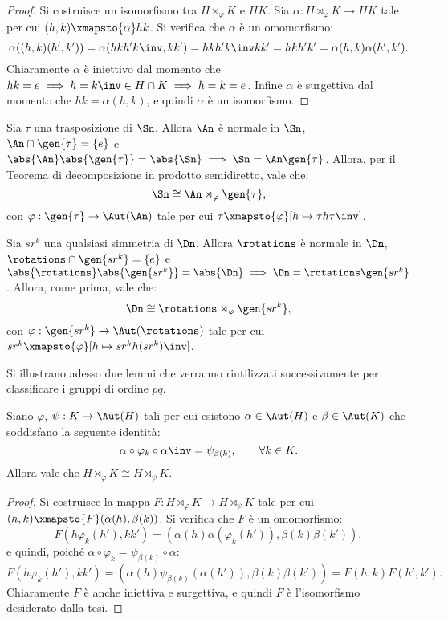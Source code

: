 \documentclass[12pt]{scrartcl}
\begin{document}
	\begin{proof}
		Si costruisce un isomorfismo tra $H \rtimes_\varphi K$ e $HK$. Sia
		$\alpha : H \rtimes_\varphi K \to HK$ tale per cui
		$(h, k) \xmapsto{\alpha} hk$. Si verifica che $\alpha$ è un
		omomorfismo:
		\[ \alpha((h,k)(h',k')) = \alpha(h k h' k\inv, k k') =
			h k h' k\inv k k' = hkh'k' = \alpha(h,k)\alpha(h',k'). \]
		Chiaramente $\alpha$ è iniettivo dal momento che $hk=e \implies h = k\inv \in H \cap K \implies h = k = e$. Infine $\alpha$ è surgettiva dal momento che $hk = \alpha(h, k)$,
		e quindi $\alpha$ è un isomorfismo.
	\end{proof}
	
	\begin{example}[$\Sn \cong \An \rtimes_\varphi \gen{\tau}$]
		Sia $\tau$ una trasposizione di $\Sn$. Allora $\An$ è normale in $\Sn$,
		$\An \cap \gen{\tau} = \{e\}$ e $\abs{\An} \abs{\gen{\tau}} = \abs{\Sn} \implies
		\Sn = \An \gen{\tau}$. Allora, per il Teorema di decomposizione in prodotto
		semidiretto, vale che:
		\[ \Sn \cong \An \rtimes_\varphi \gen{\tau}, \]
		con $\varphi : \gen{\tau} \to \Aut(\An)$ tale per cui
		$\tau \xmapsto{\varphi} [h \mapsto \tau h \tau\inv]$.
	\end{example}
	
	\begin{example}
		Sia $sr^k$ una qualsiasi simmetria di $\Dn$. Allora $\rotations$ è normale in $\Dn$,
		$\rotations \cap \gen{sr^k} = \{e\}$ e $\abs{\rotations} \abs{\gen{s r^k}} = \abs{\Dn} \implies
		\Dn = \rotations \gen{s r^k}$. Allora, come prima, vale che:
		\[ \Dn \cong \rotations \rtimes_\varphi \gen{sr^k}, \]
		con $\varphi : \gen{s r^k} \to \Aut(\rotations)$ tale per cui
		$s r^k \xmapsto{\varphi} [h \mapsto sr^k h (sr^k)\inv]$.
	\end{example}
	
	Si illustrano adesso due lemmi che verranno riutilizzati successivamente per classificare
	i gruppi di ordine $pq$.
	
	\begin{lemma}
		Siano $\varphi$, $\psi : K \to \Aut(H)$ tali per cui esistono
		$\alpha \in \Aut(H)$ e $\beta \in \Aut(K)$ che soddisfano la seguente
		identità:
		\[ \alpha \circ \varphi_k \circ \alpha\inv = \psi_{\beta(k)}, \qquad \forall k \in K. \]
		Allora vale che $H \rtimes_\varphi K \cong H \rtimes_\psi K$.
	\end{lemma}
	
	\begin{proof}
		Si costruisce la mappa $F : H \rtimes_\varphi K \to H \rtimes_\psi K$ tale
		per cui $(h, k) \xmapsto{F} (\alpha(h), \beta(k))$. Si verifica che $F$ è un omomorfismo:
		\[ F(h \varphi_k(h'), k k') = (\alpha(h) \alpha(\varphi_k(h')), \beta(k) \beta(k')), \]
		e quindi, poiché $\alpha \circ \varphi_k = \psi_{\beta(k)} \circ \alpha$:
		\[ F(h \varphi_k(h'), k k') = (\alpha(h)\psi_{\beta(k)}(\alpha(h')), \beta(k) \beta(k')) = F(h, k) F(h', k'). \]
		Chiaramente $F$ è anche iniettiva e surgettiva, e quindi $F$ è l'isomorfismo
		desiderato dalla tesi.
	\end{proof}
	
\end{document}
